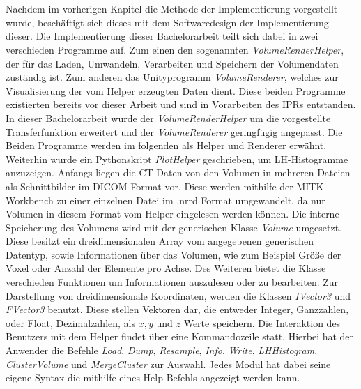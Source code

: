 \chapter{}
\label{sec:concept}


Nachdem im vorherigen Kapitel die Methode der Implementierung vorgestellt wurde, beschäftigt sich dieses mit dem Softwaredesign der Implementierung dieser.
\newline
Die Implementierung dieser Bachelorarbeit teilt sich dabei in zwei verschieden Programme auf. Zum einen den sogenannten \textit{VolumeRenderHelper}, der für das Laden, Umwandeln, Verarbeiten und Speichern der Volumendaten zuständig ist. Zum anderen das Unityprogramm \textit{VolumeRenderer}, welches zur Visualisierung der vom Helper erzeugten Daten dient. Diese beiden Programme existierten bereits vor dieser Arbeit und sind in Vorarbeiten des IPRs entstanden. In dieser Bachelorarbeit wurde der \textit{VolumeRenderHelper} um die vorgestellte Transferfunktion erweitert und der \textit{VolumeRenderer} geringfügig angepasst. Die Beiden Programme werden im folgenden als Helper und Renderer erwähnt. Weiterhin wurde ein Pythonskript \textit{PlotHelper} geschrieben, um LH-Histogramme anzuzeigen.
\newline
{}
Anfangs liegen die CT-Daten von den Volumen in mehreren Dateien als Schnittbilder im DICOM Format vor. Diese werden mithilfe der MITK Workbench zu einer einzelnen Datei im .nrrd Format umgewandelt, da nur Volumen in diesem Format vom Helper eingelesen werden können.
\newline
Die interne Speicherung des Volumens wird mit der generischen Klasse \textit{Volume} umgesetzt. Diese besitzt ein dreidimensionalen Array vom angegebenen generischen Datentyp, sowie Informationen über das Volumen, wie zum Beispiel Größe der Voxel oder Anzahl der Elemente pro Achse. Des Weiteren bietet die Klasse verschieden Funktionen um Informationen auszulesen oder zu bearbeiten. Zur Darstellung von dreidimensionale Koordinaten, werden die Klassen \textit{IVector3} und \textit{FVector3} benutzt. Diese stellen Vektoren dar, die entweder Integer, Ganzzahlen, oder Float, Dezimalzahlen, als $x,y$ und $z$ Werte speichern.
\newline
{}
Die Interaktion des Benutzers mit dem Helper findet über eine Kommandozeile statt. Hierbei hat der Anwender die Befehle \textit{Load}, \textit{Dump}, \textit{Resample}, \textit{Info}, \textit{Write}, \textit{LHHistogram}, \textit{ClusterVolume} und \textit{MergeCluster} zur Auswahl. Jedes Modul hat dabei seine eigene Syntax die mithilfe eines Help Befehls angezeigt werden kann.
